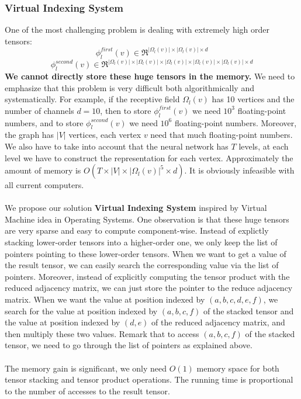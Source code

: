 \documentclass[a4paper]{article}
\begin{document}
\subsubsection{Virtual Indexing System}

One of the most challenging problem is dealing with extremely high order tensors:
$$\phi_l^{first}(v) \in \Re^{|\Omega_l(v)| \times |\Omega_l(v)| \times d}$$
$$\phi_l^{second}(v) \in \Re^{|\Omega_l(v)| \times |\Omega_l(v)| \times|\Omega_l(v)| \times |\Omega_l(v)| \times |\Omega_l(v)| \times d}$$
\textbf{\color{red} We cannot directly store these huge tensors in the memory.} We need to emphasize that this problem is very difficult both algorithmically and systematically. For example, if the receptive field $\Omega_l(v)$ has 10 vertices and the number of channels $d = 10$, then to store $\phi_l^{first}(v)$ we need $10^3$ floating-point numbers, and to store $\phi_l^{second}(v)$ we need $10^6$ floating-point numbers. Moreover, the graph has $|V|$ vertices, each vertex $v$ need that much floating-point numbers. We also have to take into account that the neural network has $T$ levels, at each level we have to construct the representation for each vertex. Approximately the amount of memory is $O(T \times |V| \times |\Omega_l(v)|^5 \times d)$. It is obviously infeasible with all current computers. \\ \\
We propose our solution \textbf{\color{red} Virtual Indexing System} inspired by Virtual Machine idea in Operating Systems. One observation is that these huge tensors are very sparse and easy to compute component-wise. Instead of explictly stacking lower-order tensors into a higher-order one, we only keep the list of pointers pointing to these lower-order tensors. When we want to get a value of the result tensor, we can easily search the corresponding value via the list of pointers. Moreover, instead of explicitly computing the tensor product with the reduced adjacency matrix, we can just store the pointer to the reduce adjacency matrix. When we want the value at position indexed by $(a, b, c, d, e, f)$, we search for the value at position indexed by $(a, b, c, f)$ of the stacked tensor and the value at position indexed by $(d, e)$ of the reduced adjacency matrix, and then multiply these two values. Remark that to access $(a, b, c, f)$ of the stacked tensor, we need to go through the list of pointers as explained above. \\ \\
The memory gain is significant, we only need $O(1)$ memory space for both tensor stacking and tensor product operations. The running time is proportional to the number of accesses to the result tensor.
\end{document}
